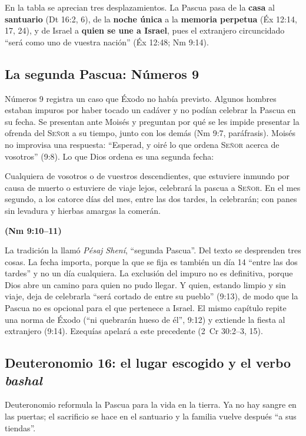 \documentclass[11pt,letterpaper]{article}
\newcommand{\SENOR}{\textsc{Señor}}
\newcommand{\fuente}[1]{\par\hfill{\upshape\bfseries\small\textcolor{tierraroja}{#1}}}
\newcommand{\destacar}[1]{\textbf{\textcolor{tierraroja}{#1}}}
\begin{document}
En la tabla se aprecian tres desplazamientos. La Pascua pasa de la \destacar{casa} al \destacar{santuario} (Dt 16:2, 6), de la \destacar{noche única} a la \destacar{memoria perpetua} (Éx 12:14, 17, 24), y de Israel a \destacar{quien se une a Israel}, pues el extranjero circuncidado ``será como uno de vuestra nación'' (Éx 12:48; Nm 9:14).

\subsection{La segunda Pascua: Números 9}
Números 9 registra un caso que Éxodo no había previsto. Algunos hombres estaban impuros por haber tocado un cadáver y no podían celebrar la Pascua en su fecha. Se presentan ante Moisés y preguntan por qué se les impide presentar la ofrenda del \SENOR{} a su tiempo, junto con los demás (Nm 9:7, paráfrasis). Moisés no improvisa una respuesta: ``Esperad, y oiré lo que ordena \SENOR{} acerca de vosotros'' (9:8). Lo que Dios ordena es una segunda fecha:

\begin{cita}Cualquiera de vosotros o de vuestros descendientes, que estuviere inmundo por causa de muerto o estuviere de viaje lejos, celebrará la pascua a \SENOR. En el mes segundo, a los catorce días del mes, entre las dos tardes, la celebrarán; con panes sin levadura y hierbas amargas la comerán.\fuente{(Nm 9:10--11)}\end{cita}

La tradición la llamó \emph{Pésaj Shení}, ``segunda Pascua''. Del texto se desprenden tres cosas. La fecha importa, porque la que se fija es también un día 14 ``entre las dos tardes'' y no un día cualquiera. La exclusión del impuro no es definitiva, porque Dios abre un camino para quien no pudo llegar. Y quien, estando limpio y sin viaje, deja de celebrarla ``será cortado de entre su pueblo'' (9:13), de modo que la Pascua no es opcional para el que pertenece a Israel. El mismo capítulo repite una norma de Éxodo (``ni quebrarán hueso de él'', 9:12) y extiende la fiesta al extranjero (9:14). Ezequías apelará a este precedente (2~Cr 30:2--3, 15).

\subsection{Deuteronomio 16: el lugar escogido y el verbo \emph{bashal}}
Deuteronomio reformula la Pascua para la vida en la tierra. Ya no hay sangre en las puertas; el sacrificio se hace en el santuario y la familia vuelve después ``a sus tiendas''.
\end{document}
